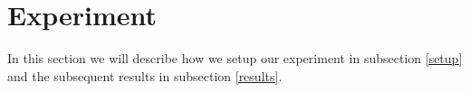 \section{Experiment}\label{Experiment}
In this section we will describe how we setup our experiment in subsection \ref{setup} and the subsequent results in subsection \ref{results}.



